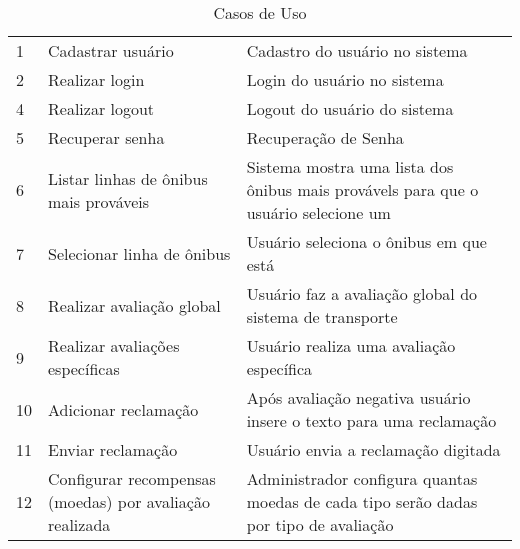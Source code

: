 \begin{table}[H]
	\caption {Casos de Uso}
	\label{tab:casosDeUso}
    \begin{tabular}{lll}
      \toprule

     	\headerCell{Nº} & \headerCell{Caso de Uso} & \headerCell{Descrição} \\

	    \midrule
			
			1 & Cadastrar usuário                                           & Cadastro do usuário no sistema \\
			2 & Realizar login                                              & Login do usuário no sistema \\
			4 & Realizar logout                                             & Logout do usuário do sistema \\
			5 & Recuperar senha                                             & Recuperação de Senha \\
			6 & \begin{minipage}{0.3\textwidth}\espacoVert Listar linhas de ônibus mais prováveis \espacoVert \end{minipage}                     & \begin{minipage}{0.5\textwidth}\espacoVert Sistema mostra uma lista dos ônibus mais provávels para que o usuário selecione um\espacoVert\end{minipage} \\
			7 & Selecionar linha de ônibus                                  & Usuário seleciona o ônibus em que está \\
			8 & Realizar avaliação global                                   & \begin{minipage}{0.5\textwidth}\espacoVert Usuário faz a avaliação global do sistema de transporte \espacoVert \end{minipage}\\
			9 & Realizar avaliações específicas                             & Usuário realiza uma avaliação específica \\
			10 & Adicionar reclamação                                       & \begin{minipage}{0.5\textwidth}\espacoVert Após avaliação negativa usuário insere o texto para uma reclamação \espacoVert \end{minipage} \\
			11 & Enviar reclamação                                          & Usuário envia a reclamação digitada \\
			12 & \begin{minipage}{0.3\textwidth}\espacoVert Configurar recompensas (moedas) por avaliação realizada  \espacoVert \end{minipage} & \begin{minipage}{0.5\textwidth}\espacoVert Administrador configura quantas moedas de cada tipo serão dadas por tipo de avaliação \espacoVert \end{minipage} \\

\end{tabular}
\end{table}
